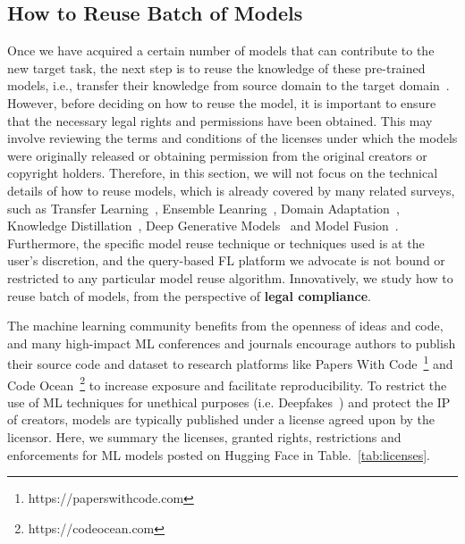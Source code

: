 \subsection{How to Reuse Batch of Models}
\label{how2reuse}
Once we have acquired a certain number of models that can contribute to the new target task, the next step is to reuse the knowledge of these pre-trained models, i.e., transfer their knowledge from source domain to the target domain~\cite{pan2009survey}.
However, before deciding on how to reuse the model, it is important to ensure that the necessary legal rights and permissions have been obtained. 
This may involve reviewing the terms and conditions of the licenses under which the models were originally released or obtaining permission from the original creators or copyright holders.
Therefore, in this section, we will not focus on the technical details of how to reuse models, which is already covered by many related surveys, such as Transfer Learning~\cite{pan2009survey}, Ensemble Leanring~\cite{zhou2012ensemble}, Domain Adaptation~\cite{wang2018deep}, Knowledge Distillation~\cite{wang2021knowledge}, Deep Generative Models~\cite{cao2022survey} and Model Fusion~\cite{ji2021emerging}.
Furthermore, the specific model reuse technique or techniques used is at the user's discretion, and the query-based FL platform we advocate is not bound or restricted to any particular model reuse algorithm.
Innovatively, we study how to reuse batch of models, from the perspective of \textbf{legal compliance}.

The machine learning community benefits from the openness of ideas and code, and many high-impact ML conferences and journals encourage authors to publish their source code and dataset to research platforms like Papers With Code~\footnote{https://paperswithcode.com} and Code Ocean~\footnote{https://codeocean.com} to increase exposure and facilitate reproducibility.
To restrict the use of ML techniques for unethical purposes (i.e. Deepfakes~\cite{mirsky2021creation}) and protect the IP of creators, models are typically published under a license agreed upon by the licensor.
Here, we summary the licenses, granted rights, restrictions and enforcements for ML models posted on Hugging Face in Table.~\ref{tab:licenses}.

